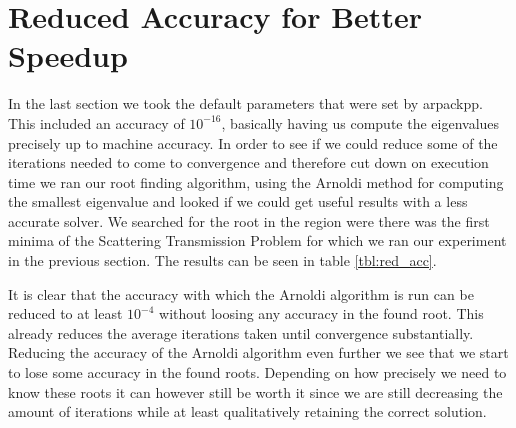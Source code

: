 \documentclass[a4paper, oneside]{discothesis}
\begin{document}
\section{Reduced Accuracy for Better Speedup}
In the last section we took the default parameters that were set by arpackpp.
This included an accuracy of $10^{-16}$, basically having us compute the eigenvalues precisely up to machine accuracy.
In order to see if we could reduce some of the iterations needed to come to convergence and therefore cut down on execution time we ran our root finding algorithm, using the Arnoldi method for computing the smallest eigenvalue and looked if we could get useful results with a less accurate solver. 
We searched for the root in the region were there was the first minima of the Scattering Transmission Problem for which we ran our experiment in the previous section.
The results can be seen in table \ref{tbl:red_acc}.
\begin{table}[h!]
	\centering
	\caption{Change in singular values against change in grid size.}
	\label{tbl:red_acc}
\end{table}

It is clear that the accuracy with which the Arnoldi algorithm is run can be reduced to at least $10^{-4}$ without loosing any accuracy in the found root.
This already reduces the average iterations taken until convergence substantially.
Reducing the accuracy of the Arnoldi algorithm even further we see that we start to lose some accuracy in the found roots.
Depending on how precisely we need to know these roots it can however still be worth it since we are still decreasing the amount of iterations while at least qualitatively retaining the correct solution.
\end{document}
